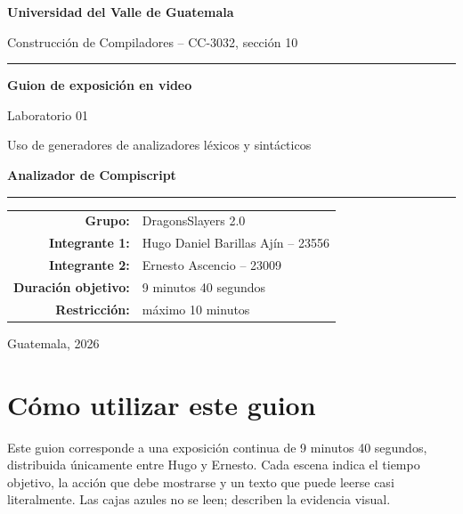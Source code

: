 \documentclass[11pt,letterpaper,oneside]{article}
\begin{document}
\hypersetup{pageanchor=false}

\begin{titlepage}
  \centering
  \vspace*{1cm}
  {\Large\bfseries Universidad del Valle de Guatemala\par}
  \vspace{0.25cm}
  {\large Construcción de Compiladores -- CC-3032, sección 10\par}
  \vfill
  \color{uvgblue}\rule{0.88\textwidth}{1.2pt}\color{black}
  \vspace{0.7cm}
  {\Huge\bfseries Guion de exposición en video\par}
  \vspace{0.35cm}
  {\LARGE Laboratorio 01\par}
  \vspace{0.25cm}
  {\Large Uso de generadores de analizadores léxicos y sintácticos\par}
  \vspace{0.65cm}
  {\Huge\color{purple}\bfseries Analizador de Compiscript\par}
  \vspace{0.7cm}
  \color{uvgblue}\rule{0.88\textwidth}{1.2pt}\color{black}
  \vfill
  \begin{tabular}{>{\bfseries}rl}
    Grupo: & DragonsSlayers 2.0 \\
    Integrante 1: & Hugo Daniel Barillas Ajín -- 23556 \\
    Integrante 2: & Ernesto Ascencio -- 23009 \\
    Duración objetivo: & 9 minutos 40 segundos \\
    Restricción: & máximo 10 minutos \\
  \end{tabular}
  \vfill
  {\large Guatemala, 2026\par}
\end{titlepage}

\hypersetup{pageanchor=true}

\section*{Cómo utilizar este guion}
{}

Este guion corresponde a una exposición continua de 9 minutos 40 segundos,
distribuida únicamente entre Hugo y Ernesto. Cada escena indica el tiempo objetivo,
la acción que debe mostrarse y un texto que puede leerse casi literalmente. Las cajas
azules no se leen; describen la evidencia visual.
\end{document}
